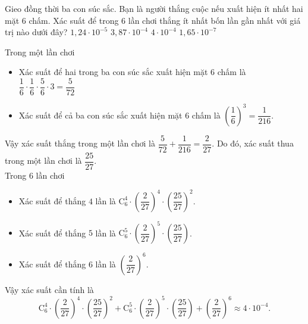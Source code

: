 \begin{ex}%
	Gieo đồng thời ba con súc sắc. Bạn là người thắng cuộc nếu xuất hiện ít nhất hai mặt $6$ chấm. Xác suất để trong $6$ lần chơi thắng ít nhất bốn lần gần nhất với giá trị nào dưới đây?
	\choice
	{$1{,}24\cdot10^{-5}$}
	{$3{,}87\cdot10^{-4}$}
	{\True $4\cdot10^{-4}$}
	{$1{,}65\cdot10^{-7}$}
	\loigiai
	{
		Trong một lần chơi
		\begin{itemize}
			\item Xác suất để hai trong ba con súc sắc xuất hiện mặt $6$ chấm là $\dfrac{1}{6}\cdot\dfrac{1}{6}\cdot\dfrac{5}{6}\cdot3=\dfrac{5}{72}$
			\item Xác suất để cả ba con súc sắc xuất hiện mặt $6$ chấm là $\left(\dfrac{1}{6}\right)^3=\dfrac{1}{216}$.
		\end{itemize}
		Vậy xác suất thắng trong một lần chơi là $\dfrac{5}{72}+\dfrac{1}{216}=\dfrac{2}{27}$. Do đó, xác suất thua trong một lần chơi là $\dfrac{25}{27}$.\\
		Trong $6$ lần chơi
		\begin{itemize}
			\item Xác suất để thắng $4$ lần là $\mathrm{C}_6^4\cdot\left(\dfrac{2}{27}\right)^4\cdot\left(\dfrac{25}{27}\right)^2$.
			\item Xác suất để thắng $5$ lần là $\mathrm{C}_6^5\cdot\left(\dfrac{2}{27}\right)^5\cdot\left(\dfrac{25}{27}\right)$.
			\item Xác suất để thắng $6$ lần là $\left(\dfrac{2}{27}\right)^6$.
		\end{itemize}
		Vậy xác suất cần tính là
		\[\mathrm{C}_6^4\cdot\left(\dfrac{2}{27}\right)^4\cdot\left(\dfrac{25}{27}\right)^2+\mathrm{C}_6^5\cdot\left(\dfrac{2}{27}\right)^5\cdot\left(\dfrac{25}{27}\right)+\left(\dfrac{2}{27}\right)^6\approx 4\cdot10^{-4}.\]
	}
\end{ex}%
